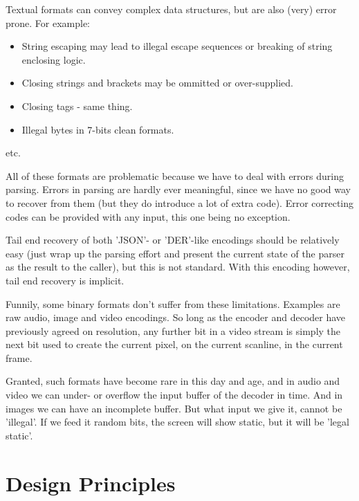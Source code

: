 Textual formats can convey complex data structures, but are also
(very) error prone. For example:

\begin{itemize}
\item String escaping may lead to illegal escape sequences or breaking
  of string enclosing logic.
\item Closing strings and brackets may be ommitted or over-supplied.
\item Closing tags - same thing.
\item Illegal bytes in 7-bits clean formats.
\end{itemize}
etc.

All of these formats are problematic because we have to deal with
errors during parsing. Errors in parsing are hardly ever meaningful,
since we have no good way to recover from them (but they do introduce
a lot of extra code). Error correcting codes can be provided with any input,
this one being no exception.

Tail end recovery of both 'JSON'- or 'DER'-like encodings should be
relatively easy (just wrap up the parsing effort and present the current
state of the parser as the result to the caller), but this is not standard.
With this encoding however, tail end recovery is implicit.

Funnily, some binary formats don't suffer from these limitations.
Examples are raw audio, image and video encodings. So long as the
encoder and decoder have previously agreed on resolution,
any further bit in a video stream is simply the next bit used to
create the current pixel, on the current scanline, in the current frame.

Granted, such formats have become rare in this day and age,
and in audio and video we can under- or overflow the input buffer of the
decoder in time. And in images we can have an incomplete buffer.
But what input we give it, cannot be 'illegal'. If we feed
it random bits, the screen will show static, but it will be 'legal static'.

\section{Design Principles}
 

